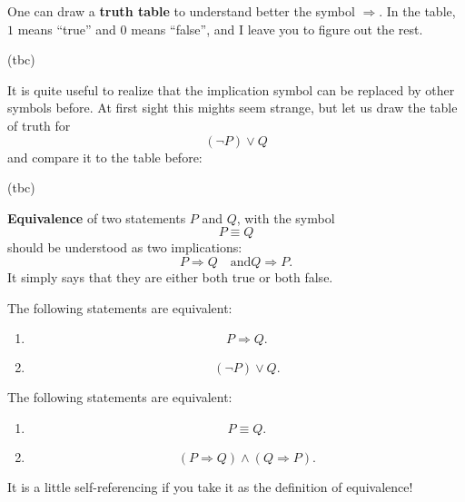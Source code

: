 \documentclass[
	fontsize=10pt, %
	twoside=true, %
	secnumdepth=1, %
	numbers=noenddot, %
]{kaobook}
\begin{document}
One can draw a \textbf{truth table} to understand better the symbol $\Rightarrow$. In the table, $1$ means ``true'' and $0$ means ``false'', and I leave you to figure out the rest.

(tbc)

It is quite useful to realize that the implication symbol can be replaced by other symbols before. At first sight this mights seem strange, but let us draw the table of truth for
\begin{equation*}
(\neg P) \lor Q
\end{equation*}
and compare it to the table before:

(tbc)

\textbf{Equivalence} of two statements $P$ and $Q$, with the symbol
\begin{equation*}
P\equiv Q
\end{equation*}
should be understood as two implications:
\begin{equation*}
P\Rightarrow Q\quad\text{and} Q\Rightarrow P.
\end{equation*}
It simply says that they are either both true or both false.

\begin{proposition}
The following statements are equivalent:
\begin{enumerate}
	\item \begin{equation*}P\Rightarrow Q.\end{equation*}
	\item \begin{equation*}(\neg P) \lor Q.\end{equation*}
\end{enumerate}
\end{proposition}

\begin{proposition}
The following statements are equivalent:
\begin{enumerate}
	\item \begin{equation*}P\equiv Q.\end{equation*}
	\item \begin{equation*}(P\Rightarrow Q)\land(Q\Rightarrow P).\end{equation*}
\end{enumerate}
It is a little self-referencing if you take it as the definition of equivalence!
\end{proposition}
\end{document}

